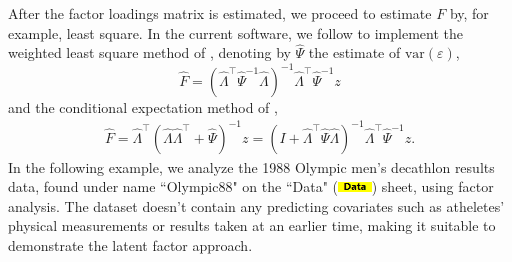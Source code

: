 \documentclass[article]{jss}
\numberwithin{equation}{subsection}
\newcommand{\shtData}{``Data" (\includegraphics[height=8pt, keepaspectratio=true]{img/DataSheetTab_png}) }
\begin{document}
        After the factor loadings matrix is estimated, we proceed to estimate $F$ by, for example, least square. In the current software, we follow \cite{anderson2003introMVA3e} to implement the weighted least square method of \cite{bartlett1938}, denoting by $\hat{\Psi}$ the estimate of $\textrm{var}(\varepsilon)$,
        \begin{equation}\label{eq:bartlett factor score}
	        \hat F = {\left( {{\hat\Lambda ^\intercal}{\hat\Psi ^{ - 1}}\hat\Lambda} \right)^{ - 1}}{\hat\Lambda ^\intercal}{\hat\Psi ^{ - 1}}z
	    \end{equation}
        and the conditional expectation method of \cite{Thomson1951},
        \begin{align}\label{eq:thomson factor score}
	        \hat F = {\hat\Lambda ^\intercal}{\left( {\hat\Lambda {\hat\Lambda ^\intercal} + \hat\Psi } \right)^{ - 1}}z = {\left( {I + {\hat\Lambda ^\intercal}\hat\Psi \hat\Lambda } \right)^{ - 1}}{\hat\Lambda ^\intercal}{\hat\Psi ^{ - 1}}z.
	    \end{align}
        In the following example, we analyze the 1988 Olympic men's decathlon results data, found under name ``Olympic88" on the \shtData sheet, using factor analysis. The dataset doesn't contain any predicting covariates such as atheletes' physical measurements or results taken at an earlier time, making it suitable to demonstrate the latent factor approach.
\end{document}
